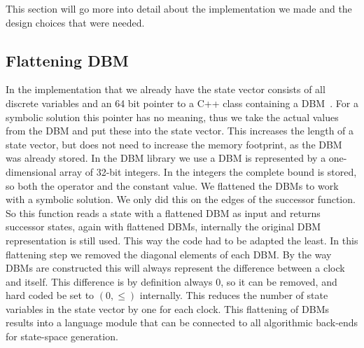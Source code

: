 This section will go more into detail about the implementation we made and the design choices that were needed. 

\subsection{Flattening DBM}
In the \ltsmin{} implementation that we already have the state vector consists of all discrete variables and an 64 bit pointer to a C++ class containing a DBM~\cite{eemcs21972}. For a symbolic solution this pointer has no meaning, thus we take the actual values from the DBM and put these into the state vector. This increases the length of a state vector, but does not need to increase the memory footprint, as the DBM was already stored. 
In the DBM library we use a DBM is represented by a one-dimensional array of 32-bit integers. In the integers the complete bound is stored, so both the operator and the constant value. We flattened the DBMs to work with a symbolic solution. We only did this on the edges of the successor function. So this function reads a state with a flattened DBM as input and returns successor states, again with flattened DBMs, internally the original DBM representation is still used. This way the code had to be adapted the least. In this flattening step we removed the diagonal elements of each DBM. By the way DBMs are constructed this will always represent the difference between a clock and itself. This difference is by definition always 0, so it can be removed, and hard coded be set to $(0,\leq)$ internally. This reduces the number of state variables in the state vector by one for each clock. This flattening of DBMs results into a language module that can be connected to all \ltsmin{} algorithmic back-ends for state-space generation. 

